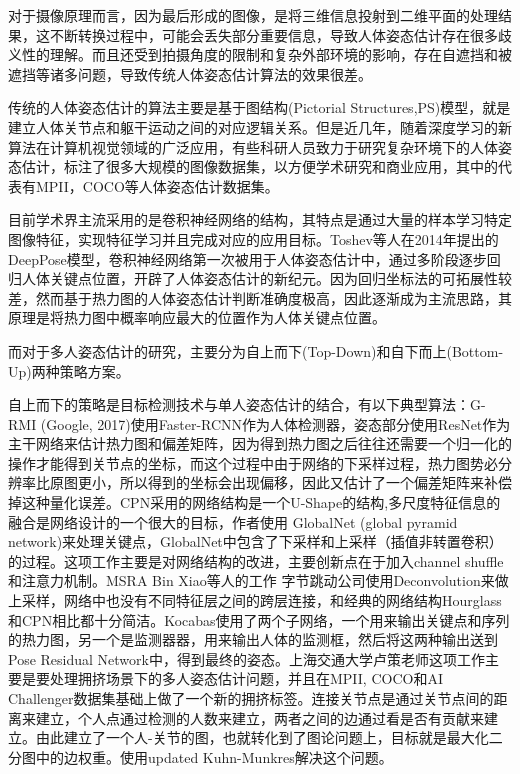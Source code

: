 对于摄像原理而言，因为最后形成的图像，是将三维信息投射到二维平面的处理结果，这不断转换过程中，可能会丢失部分重要信息，导致人体姿态估计存在很多歧义性的理解。而且还受到拍摄角度的限制和复杂外部环境的影响，存在自遮挡和被遮挡等诸多问题，导致传统人体姿态估计算法的效果很差。

传统的人体姿态估计的算法主要是基于图结构(Pictorial Structures,PS)\cite{PS}模型，就是建立人体关节点和躯干运动之间的对应逻辑关系。但是近几年，随着深度学习的新算法在计算机视觉领域的广泛应用，有些科研人员致力于研究复杂环境下的人体姿态估计，标注了很多大规模的图像数据集，以方便学术研究和商业应用，其中的代表有MPII，COCO等人体姿态估计数据集。

目前学术界主流采用的是卷积神经网络的结构，其特点是通过大量的样本学习特定图像特征，实现特征学习并且完成对应的应用目标。Toshev等人在2014年提出的DeepPose模型，卷积神经网络第一次被用于人体姿态估计中，通过多阶段逐步回归人体关键点位置，开辟了人体姿态估计的新纪元。因为回归坐标法的可拓展性较差，然而基于热力图的人体姿态估计判断准确度极高，因此逐渐成为主流思路，其原理是将热力图中概率响应最大的位置作为人体关键点位置。

而对于多人姿态估计的研究，主要分为自上而下(Top-Down)和自下而上(Bottom-Up)两种策略方案。

自上而下的策略是目标检测技术与单人姿态估计的结合，有以下典型算法：G-RMI (Google, 2017)使用Faster-RCNN作为人体检测器，姿态部分使用ResNet作为主干网络来估计热力图和偏差矩阵，因为得到热力图之后往往还需要一个归一化的操作才能得到关节点的坐标，而这个过程中由于网络的下采样过程，热力图势必分辨率比原图更小，所以得到的坐标会出现偏移，因此又估计了一个偏差矩阵来补偿掉这种量化误差。CPN采用的网络结构是一个U-Shape的结构,多尺度特征信息的融合是网络设计的一个很大的目标，作者使用 GlobalNet (global pyramid network)来处理关键点，GlobalNet中包含了下采样和上采样（插值非转置卷积）的过程。这项工作主要是对网络结构的改进，主要创新点在于加入channel shuffle和注意力机制。MSRA Bin Xiao等人的工作
字节跳动公司使用Deconvolution来做上采样，网络中也没有不同特征层之间的跨层连接，和经典的网络结构Hourglass和CPN相比都十分简洁。Kocabas使用了两个子网络，一个用来输出关键点和序列的热力图，另一个是监测器器，用来输出人体的监测框，然后将这两种输出送到Pose Residual Network中，得到最终的姿态。上海交通大学卢策老师这项工作主要是要处理拥挤场景下的多人姿态估计问题，并且在MPII, COCO和AI Challenger数据集基础上做了一个新的拥挤标签。连接关节点是通过关节点间的距离来建立，个人点通过检测的人数来建立，两者之间的边通过看是否有贡献来建立。由此建立了一个人-关节的图，也就转化到了图论问题上，目标就是最大化二分图中的边权重。使用updated Kuhn-Munkres解决这个问题。

